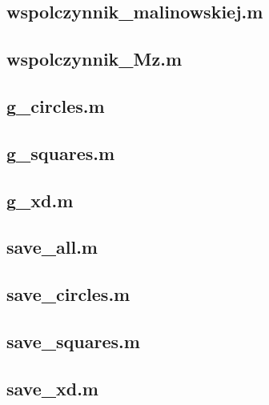 \subsection*{wspolczynnik\_malinowskiej.m  } \newpage
\subsection*{wspolczynnik\_Mz.m            } \newpage
\subsection*{g\_circles.m                  } \newpage
\subsection*{g\_squares.m                  } \newpage
\subsection*{g\_xd.m                       } \newpage
\subsection*{save\_all.m                   } \newpage
\subsection*{save\_circles.m               } \newpage
\subsection*{save\_squares.m               } \newpage
\subsection*{save\_xd.m                    } \newpage



